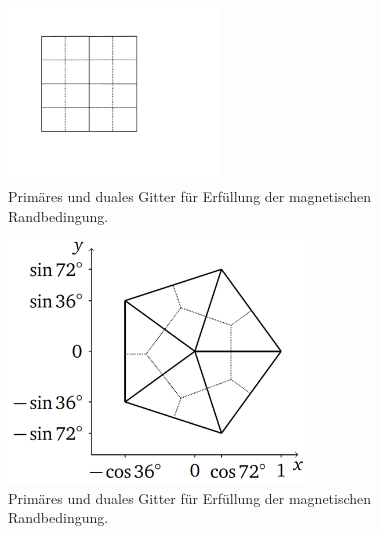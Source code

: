 \documentclass[Protokollheft.tex]{subfiles}
\begin{document}
\begin{figure}[h]
	\centering
	\includegraphics[trim = 30mm 35mm 70mm 15mm, clip,width=0.5\textwidth]{mgn_Rand_1.pdf}
	\caption{Primäres und duales Gitter für Erfüllung der magnetischen Randbedingung.}
	\label{Abb:mgn_Rand_1}
\end{figure}
\begin{figure}[h]
	\centering
	\includegraphics[width=0.7\textwidth]{mgn_Rand_2.pdf}
	\caption{Primäres und duales Gitter für Erfüllung der magnetischen Randbedingung.}
	\label{Abb:mgn_Rand_2}
\end{figure}
\end{document}
